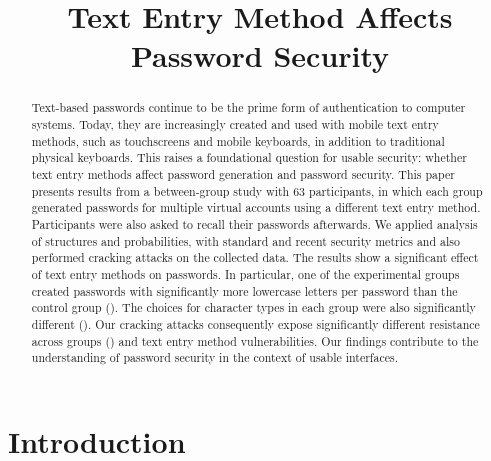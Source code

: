 \documentclass[conference]{IEEEtran}
\begin{document}
\title{Text Entry Method Affects Password Security}
\author{
\and
{}
\and
{}
}










\maketitle


\begin{abstract}
Text-based passwords continue to be the prime form of authentication to computer systems. Today, they are increasingly created and used with mobile text entry methods, such as touchscreens and mobile keyboards, in addition to traditional physical keyboards.
This raises a foundational question for usable security: whether text entry methods affect password generation and password security. 
This paper presents results from a between-group study with 63 participants, in which each group generated passwords for multiple virtual accounts using a different text entry method. Participants were also asked to recall their passwords afterwards. 
We applied analysis of structures and probabilities, with standard and recent security metrics and also performed cracking attacks on the collected data. 
The results show a significant effect of text entry methods on passwords. 
In particular, one of the experimental groups created passwords with significantly more lowercase letters per password than the control group (). The choices for character types in each group were also significantly different ().
Our cracking attacks consequently expose significantly different resistance across groups () and text entry method vulnerabilities. 
Our findings contribute to the understanding of password security in the context of usable interfaces.
\end{abstract}


\section{Introduction}
\end{document}
